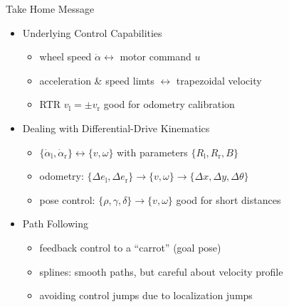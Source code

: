 \documentclass{beamer}
\begin{document}
\begin{frame}{Take Home Message}

\begin{itemize}

\item
  Underlying Control Capabilities
  \begin{itemize}
  \item
    wheel speed $\dot\alpha\leftrightarrow$ motor command $u$
  \item
    acceleration \& speed limts $\leftrightarrow$ trapezoidal velocity
  \item
    RTR $v_\text{l}=\pm v_\text{r}$ good for odometry calibration
  \end{itemize}

\item
  Dealing with Differential-Drive Kinematics
  \begin{itemize}
    \item
      $\{\dot\alpha_\text{l},\dot\alpha_\text{r}\} \leftrightarrow \{v,\omega\}$ with parameters $\{R_\text{l}, R_\text{r}, B\}$
    \item
      odometry: $\{\Delta e_\text{l}, \Delta e_\text{r}\} \rightarrow \{v,\omega\} \rightarrow \{\Delta x, \Delta y, \Delta \theta\}$
    \item
      pose control: $\{\rho, \gamma, \delta\} \rightarrow \{v,\omega\}$ good for short distances
  \end{itemize}

\item
  Path Following
  \begin{itemize}
  \item
    feedback control to a ``carrot'' (goal pose)
  \item
    splines: smooth paths, but careful about velocity profile
  \item
    avoiding control jumps due to localization jumps
  \end{itemize}
\end{itemize}

\end{frame}
\end{document}
